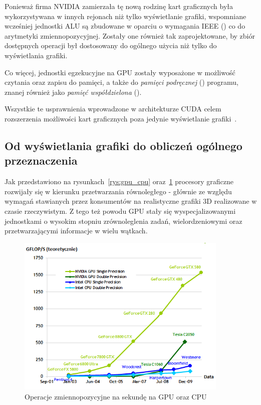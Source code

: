 Ponieważ firma NVIDIA zamierzała tę nową rodzinę kart graficznych była wykorzystywana w innych rejonach niż tylko wyświetlanie grafiki, wspomniane wcześniej jednostki ALU są zbudowane w oparciu o wymagania IEEE () co do arytmetyki zmiennopozycyjnej. Zostały one również tak zaprojektowane, by zbiór dostępnych operacji był dostosowany do ogólnego użycia niż tylko do wyświetlania grafiki. 

Co więcej, jednostki egzekucyjne na GPU zostały wyposażone w możliwość czytania oraz zapisu do pamięci, a także do \emph{pamięci podręcznej} () programu, znanej również jako \emph{pamięć współdzielona} ().

Wszystkie te usprawnienia wprowadzone w architekturze CUDA celem rozszerzenia możliwości kart graficznych poza jedynie wyświetlanie grafiki~\cite{Cuda:Example}.

\subsection{Od wyświetlania grafiki do obliczeń ogólnego przeznaczenia}
Jak przedstawiono na rysunkach~\ref{rys:gpu_cpu} oraz~\ref{rys:gpu_cpu2} procesory graficzne rozwijały się w kierunku przetwarzania równoległego - głównie ze względu wymagań stawianych przez konsumentów na realistyczne grafiki 3D realizowane w czasie rzeczywistym. Z tego też powodu GPU stały się wyspecjalizowanymi jednostkami o wysokim stopniu zrównoleglenia zadań, wielordzeniowymi oraz przetwarzającymi informacje w wielu wątkach. 

\begin{figure}[ht]
\centering\includegraphics[width=0.9\textwidth]{figures/03/gpu_cpu2.png}
\caption{Operacje zmiennopozycyjne na sekundę na GPU oraz CPU~\cite{Cuda:PGuide}}\label{rys:gpu_cpu2}
\end{figure}

